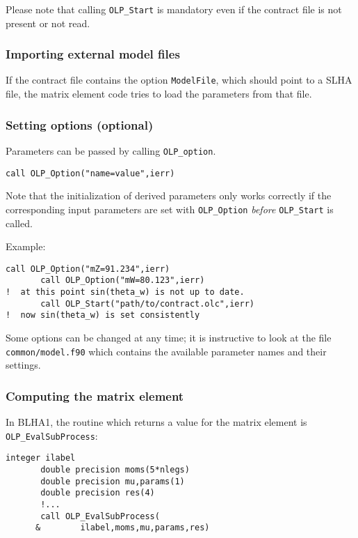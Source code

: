 Please note that calling \texttt{OLP\_Start} is mandatory even if the contract
file is not present or not read.

\subsubsection{Importing external model files}
If the contract file contains the option
\texttt{ModelFile}, which should point to a SLHA file,
the matrix element code tries to load the parameters from that file.

\subsubsection{Setting options (optional)}
Parameters can be passed by calling \texttt{OLP\_option}.
\begin{lstlisting}[style=fortran]
       call OLP_Option("name=value",ierr)
\end{lstlisting}

Note that the initialization of derived parameters only works correctly
if the corresponding input parameters are set with \texttt{OLP\_Option}
\emph{before} \texttt{OLP\_Start} is called.

Example:
\begin{lstlisting}[style=fortran]
       call OLP_Option("mZ=91.234",ierr)
       call OLP_Option("mW=80.123",ierr)
!  at this point sin(theta_w) is not up to date.
       call OLP_Start("path/to/contract.olc",ierr)
!  now sin(theta_w) is set consistently
\end{lstlisting}

Some options can be changed at any time; it is instructive to 
look at the file
\texttt{common/model.f90} which contains  the available
parameter names and  their settings.

\subsubsection{Computing the matrix element}

In BLHA1, the routine which returns a value for the matrix element is
\texttt{OLP\_EvalSubProcess}:
\begin{lstlisting}[style=fortran]
       integer ilabel
       double precision moms(5*nlegs)
       double precision mu,params(1)
       double precision res(4)
       !...
       call OLP_EvalSubProcess(
      &        ilabel,moms,mu,params,res)
\end{lstlisting}

